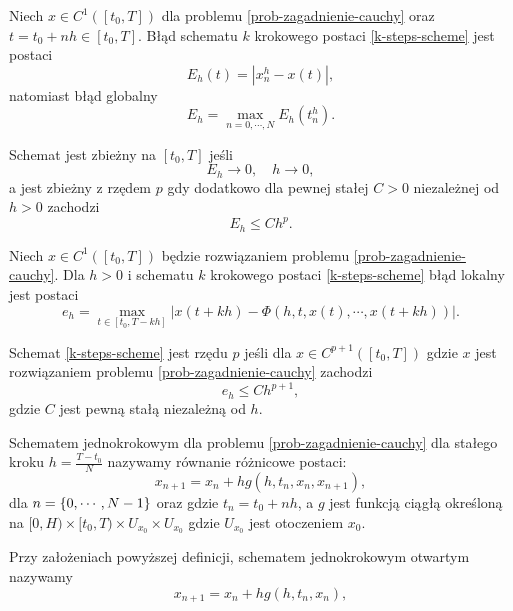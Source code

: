 \documentclass[12pt,a4paper]{report}
\begin{document}
\begin{definition}
Niech $ x \in C^{1}([t_0,T])$ dla problemu \ref{prob-zagadnienie-cauchy} oraz $t=t_0 +nh \in [t_0,T]$. Błąd schematu $k$ krokowego postaci \eqref{k-steps-scheme} jest postaci 
$$
E_h(t) = |x^{h}_{n} - x(t)|,
$$ 
natomiast błąd globalny 
$$
E_h = \max_{n=0,\cdots,N} E_h(t^{h}_{n}).
$$
\end{definition}
\begin{definition}
Schemat jest zbieżny na $[t_0,T]$ jeśli 
$$
E_h \to 0, \quad h \to 0,
$$
a jest zbieżny z rzędem $p$ gdy dodatkowo dla pewnej stałej $C>0$ niezależnej od $h>0$ zachodzi 
$$
E_h \leq C h^p.
$$
\end{definition}
\begin{definition}
Niech $x \in C^1([t_0,T]) $ będzie rozwiązaniem problemu \ref{prob-zagadnienie-cauchy}. Dla $h>0$ i schematu $k$ krokowego postaci \eqref{k-steps-scheme} błąd lokalny jest postaci
\begin{equation}
e_h = \max_{t \in [t_0,T-kh]} |x(t + kh) - \Phi (h,t,x(t),\cdots, x(t + kh))|.
\end{equation}
\end{definition}
\begin{definition}
Schemat \eqref{k-steps-scheme} jest rzędu $p$ jeśli dla $x \in C^{p+1}([t_0,T])$ gdzie $x$ jest rozwiązaniem problemu \ref{prob-zagadnienie-cauchy} zachodzi
$$
e_h \leq C h^{p+1},
$$
gdzie $C$ jest pewną stałą niezależną od $h$. 
\end{definition}
\begin{definition}
Schematem jednokrokowym dla problemu \ref{prob-zagadnienie-cauchy} dla stałego kroku $h = \frac{T-t_0}{N}$ nazywamy równanie różnicowe postaci:
$$
x_{n+1} = x_n + h g(h,t_{n},x_{n},x_{n+1}),  
$$
dla $n= \left\lbrace {0,\cdots,N-1} \right\rbrace$ oraz gdzie $t_{n} = t_{0} + nh$, a $g$ jest funkcją ciągłą określoną na $[0,H) \times [t_0,T) \times U_{x_0} \times U_{x_0} $ gdzie $ U_{x_0} $ jest otoczeniem $x_0$.   
\end{definition}
\begin{definition}
Przy założeniach powyższej definicji, schematem jednokrokowym otwartym nazywamy 
$$
x_{n+1} = x_n + h g(h,t_{n},x_{n}),  
$$
\end{definition}
 
\end{document}
